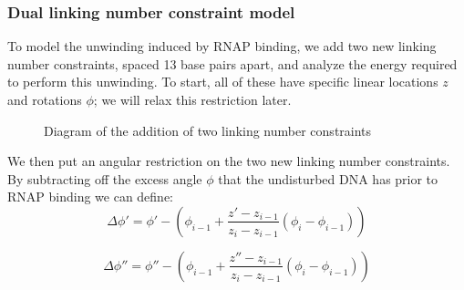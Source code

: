 \documentclass[11pt]{article}
\begin{document}
\FloatBarrier
\subsubsection{Dual linking number constraint model}
To model the unwinding induced by RNAP binding, we add two new linking number constraints, spaced 13 base pairs apart, and analyze the energy required to perform this unwinding. To start, all of these have specific linear locations \(z\) and rotations \(\phi\); we will relax this restriction later.

\begin{figure}[h]
    \centering
    \caption{Diagram of the addition of two linking number constraints}
    \label{fig:lnc_diagram}
\end{figure}

We then put an angular restriction on the two new linking number constraints. By subtracting off the excess angle \(\phi\) that the undisturbed DNA has prior to RNAP binding we can define:
\begin{equation}
    \Delta \phi' = \phi' - \left(\phi_{i - 1} + \frac{z' - z_{i-1}}{z_i - z_{i-1}} (\phi_i - \phi_{i-1})\right)
\end{equation}

\begin{equation}
    \Delta \phi'' = \phi'' - \left(\phi_{i - 1} + \frac{z'' - z_{i-1}}{z_i - z_{i-1}} (\phi_i - \phi_{i-1})\right)
\end{equation}
\end{document}
